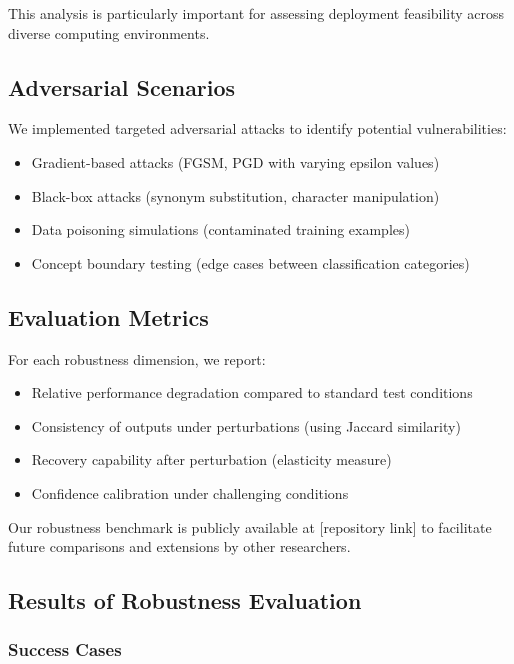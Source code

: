 \documentclass[11pt,a4paper]{article}
\begin{document}
This analysis is particularly important for assessing deployment feasibility across diverse computing environments.

\subsection{Adversarial Scenarios}

We implemented targeted adversarial attacks to identify potential vulnerabilities:

\begin{itemize}
    \item Gradient-based attacks (FGSM, PGD with varying epsilon values)
    \item Black-box attacks (synonym substitution, character manipulation)
    \item Data poisoning simulations (contaminated training examples)
    \item Concept boundary testing (edge cases between classification categories)
\end{itemize}

\subsection{Evaluation Metrics}

For each robustness dimension, we report:
\begin{itemize}
    \item Relative performance degradation compared to standard test conditions
    \item Consistency of outputs under perturbations (using Jaccard similarity)
    \item Recovery capability after perturbation (elasticity measure)
    \item Confidence calibration under challenging conditions
\end{itemize}

Our robustness benchmark is publicly available at [repository link] to facilitate future comparisons and extensions by other researchers.

\subsection{Results of Robustness Evaluation}


\subsubsection{Success Cases}
\end{document}
